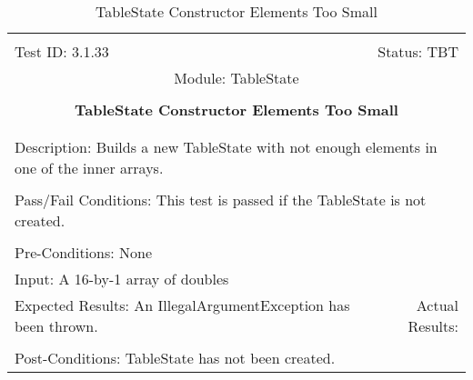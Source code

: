 \documentclass[titlepage]{article}
\begin{document}
\begin{center}%
\begin{table}
\begin{tabular}{|l r|}\hline&\\[-2mm]
	Test ID: 3.1.33	&Status: TBT\\[-3mm]
	\multicolumn{2}{|c|}{Module: TableState}\\&\\
	\multicolumn{2}{|c|}{\textbf{\large{TableState Constructor Elements Too Small}}}\\&\\\hline&\\[-3mm]
	\multicolumn{2}{|p{\textwidth}|}{Description: Builds a new TableState with not enough elements in one of the inner arrays.}\\[1mm]\hline&\\[-3mm]
	\multicolumn{2}{|p{\textwidth}|}{Pass/Fail Conditions: This test is passed if the TableState is not created.}\\[1mm]\hline&\\[-3mm]
	\multicolumn{2}{|p{\textwidth}|}{Pre-Conditions: None}\\[4mm]
	\multicolumn{2}{|p{\textwidth}|}{Input: A 16-by-1 array of doubles}\\[2mm]\hline
	\multicolumn{1}{|p{0.49\textwidth}}{Expected Results: An IllegalArgumentException has been thrown.}	&\multicolumn{1}{|p{0.45\textwidth}|}{Actual Results: }\\\hline&\\[-3mm]
	\multicolumn{2}{|p{\textwidth}|}{Post-Conditions: TableState has not been created.}\\\hline
\end{tabular}
\caption{TableState Constructor Elements Too Small}
\end{table}
\end{center}
\end{document}
